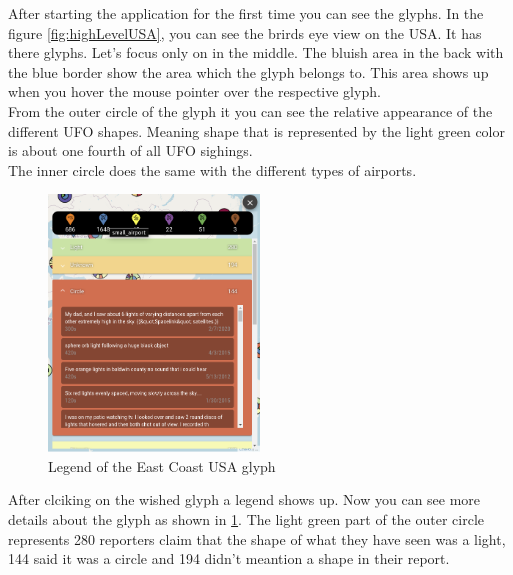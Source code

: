 \documentclass{article}
\begin{document}
After starting the application for the first time you can see the glyphs. In the figure \ref{fig:highLevelUSA}, you can see the brirds eye view on the USA. It has there glyphs. Let's focus only on in the middle. The bluish area in the back with the blue border show the area which the glyph belongs to. This area shows up when you hover the mouse pointer over the respective glyph.
\\
From the outer circle of the glyph it you can see the relative appearance of the different UFO shapes. Meaning shape that is represented by the light green color is about one fourth of all UFO sighings.
\\
The inner circle does the same with the different types of airports.
\\

\begin{figure} 
    \centering
    \includegraphics[width=0.5\textwidth]{legendEastCostUsa2}
    \caption{Legend of the East Coast USA glyph}
    \label{fig:legendEastCostUsa2}
\end{figure}

After clciking on the wished glyph a legend shows up. 
Now you can see more details about the glyph as shown in \ref{fig:legendEastCostUsa2}. 
The light green part of the outer circle represents 280 reporters claim that the shape 
of what they have seen was a light, 144 said it was a circle and 194 
didn't meantion a shape in their report. \\
\end{document}
